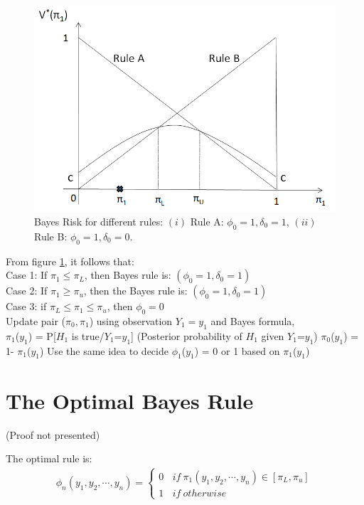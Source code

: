 \documentclass[12pt]{report}
\begin{document}
\begin{figure}
	\centering
	\includegraphics[scale=0.7]{Figures/BayesRisk_2017.png}
	\caption{Bayes Risk for different rules: $ (i)$ Rule A: $ \phi_0=1, \delta_0=1$, $(ii)$ Rule B: $\phi_0=1, \delta_0=0$.}	
	\label{fig:BayesRisk}	
\end{figure}

\noindent From figure \ref{fig:BayesRisk}, it follows that:\\
Case 1: If $\pi_1 \leq \pi_L$, then Bayes rule is: $(\phi_0=1, \delta_0=1)$\\
Case 2: If $\pi_1 \geq \pi_u$, then the Bayes rule is: $(\phi_0=1, \delta_0=1)$\\
Case 3: if $\pi_L \le \pi_1 \le \pi_u$, then $\phi_0=0$\\
\newline
Update pair ($\pi_0,\pi_1$) using observation $Y_1=y_1$ and Bayes formula,\newline\\
$\pi_1$($y_1$) = P[$H_1$ is true/$Y_1$=$y_1$]  (Posterior probability of $H_1$ given $Y_1$=$y_1$) \newline
$\pi_0$($y_1$) = 1- $\pi_1$($y_1$)\newline
Use the same idea to decide $\phi_1$($y_1$) = 0 or 1 based on $\pi_1$($y_1$)

\section{The Optimal Bayes Rule}
(Proof not presented)\newline

The optimal rule is:
\begin{eqnarray}
\label{l10}
\phi_n(y_1,y_2,\cdots,y_n) =  
\begin{cases}
0 \ \ \ \ if \ \pi_1(y_1,y_2,\cdots,y_n)\in[\pi_L,\pi_u] \\
1 \ \ \ \ if \ otherwise
\end{cases}
\end{eqnarray}
\end{document}
